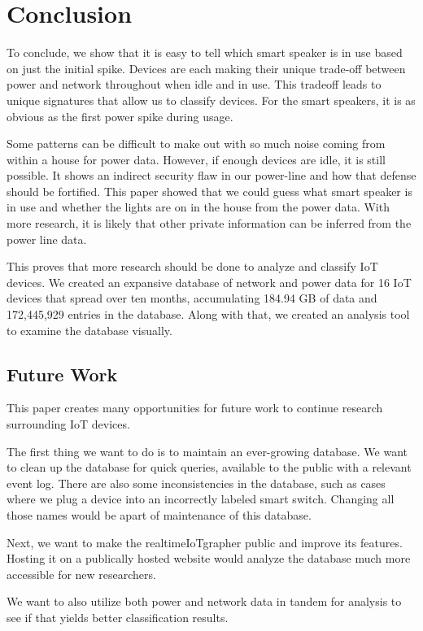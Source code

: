 \chapter{Conclusion}
\label{Conclusion}

To conclude, we show that it is easy to tell which smart speaker is in use based on just the initial spike. Devices are each making their unique trade-off between power and network throughout when idle and in use. This tradeoff leads to unique signatures that allow us to classify devices. For the smart speakers, it is as obvious as the first power spike during usage.

Some patterns can be difficult to make out with so much noise coming from within a house for power data. However, if enough devices are idle, it is still possible. It shows an indirect security flaw in our power-line and how that defense should be fortified. This paper showed that we could guess what smart speaker is in use and whether the lights are on in the house from the power data. With more research, it is likely that other private information can be inferred from the power line data.

This proves that more research should be done to analyze and classify IoT devices. We created an expansive database of network and power data for 16 IoT devices that spread over ten months, accumulating 184.94 GB of data and 172,445,929 entries in the database. Along with that, we created an analysis tool to examine the database visually.

\section{Future Work}
This paper creates many opportunities for future work to continue research surrounding IoT devices.

The first thing we want to do is to maintain an ever-growing database. We want to clean up the database for quick queries, available to the public with a relevant event log. There are also some inconsistencies in the database, such as cases where we plug a device into an incorrectly labeled smart switch. Changing all those names would be apart of maintenance of this database.

Next, we want to make the realtimeIoTgrapher public and improve its features. Hosting it on a publically hosted website would analyze the database much more accessible for new researchers.

We want to also utilize both power and network data in tandem for analysis to see if that yields better classification results.

